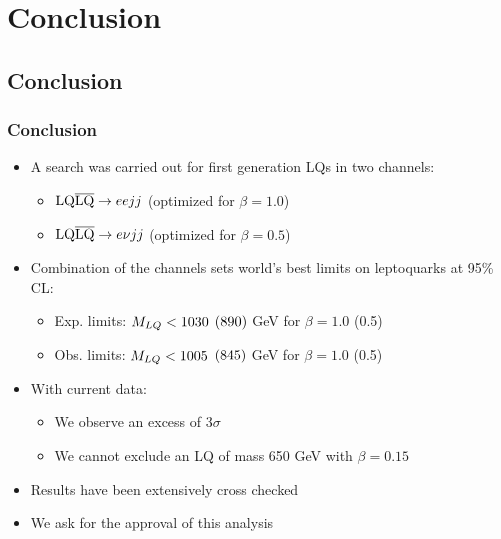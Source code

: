 \documentclass[bigger]{beamer}
\begin{document}
\section{Conclusion}
\label{sec-6}
\subsection{Conclusion}
\label{sec-6-1}
\begin{frame}
\frametitle{Conclusion}
\label{sec-6-1-1}
\label{sec-6-1-1-1}

\ChangeItemFont{\footnotesize}{\footnotesize}{\footnotesize}
\begin{itemize}
\item A search was carried out for first generation LQs in two channels:
\begin{itemize}
\item $\text{LQ}\overline{\text{LQ}}\rightarrow eejj$  (optimized for $\beta = 1.0$)
\item $\text{LQ}\overline{\text{LQ}}\rightarrow e\nu jj$ (optimized for $\beta = 0.5$)
\end{itemize}
\item Combination of the channels sets world's best limits on leptoquarks at 95\% CL:
\begin{itemize}
\item Exp. limits: $M_{LQ} < 1030$ $(890)$ GeV for $\beta = 1.0$ (0.5)
\item Obs. limits: $M_{LQ} < 1005$ $(845)$ GeV for $\beta = 1.0$ (0.5)
\end{itemize}
\item With current data:
\begin{itemize}
\item We observe an excess of $3\sigma$
\item We cannot exclude an LQ of mass 650 GeV with $\beta = 0.15$
\end{itemize}
\item Results have been extensively cross checked
\item We ask for the approval of this analysis
\end{itemize}
\end{frame}
\end{document}
